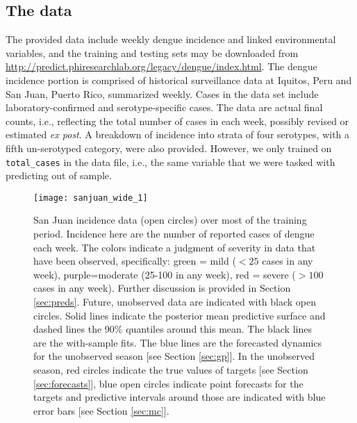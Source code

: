 \documentclass[12pt]{article}
\begin{document}
\subsection{The data}
\label{sec:data}

The provided data include weekly dengue incidence and linked environmental
variables, and the training and testing sets may be downloaded from
\url{http://predict.phiresearchlab.org/legacy/dengue/index.html}.  The dengue incidence portion is
comprised of historical surveillance data at Iquitos, Peru and San Juan,
Puerto Rico, summarized weekly. Cases in the data set include
laboratory-confirmed and serotype-specific cases.  The data are actual final
counts, i.e., reflecting the total number of cases in each week, possibly
revised or estimated {\em ex post}.  A breakdown of incidence into strata of
four serotypes, with a fifth un-serotyped category, were also provided. %
However, we only trained on \verb!total_cases! in the data file, i.e., the same variable that
we were tasked with predicting out of sample.

\begin{figure}[ht!]
\centering
\texttt{[image: sanjuan\_wide\_1]}
\vspace{-0.5cm}
\caption{San Juan incidence data (open circles) over most of the training
period. Incidence here are the number of reported cases of dengue each week.
The colors indicate a judgment of severity in data that have been observed,
specifically: green = mild ($<25$ cases in any week), purple=moderate (25-100
in any week), red = severe ($>100$ cases in any week). Further discussion is
provided in Section \ref{sec:preds}. Future, unobserved data are indicated
with black open circles. Solid lines indicate the posterior mean predictive
surface and dashed lines the 90\% quantiles around this mean. The black lines
are the with-sample fits. The blue lines are the forecasted dynamics for the
unobserved season [see Section \ref{sec:gp}]. In the unobserved season, red
circles indicate the true values of targets [see Section \ref{sec:forecasts}],
blue open circles indicate point forecasts for the targets and predictive
intervals around those are indicated with blue error bars [see Section
\ref{sec:mc}].}
\label{f:sj1}
\end{figure}
\end{document}
